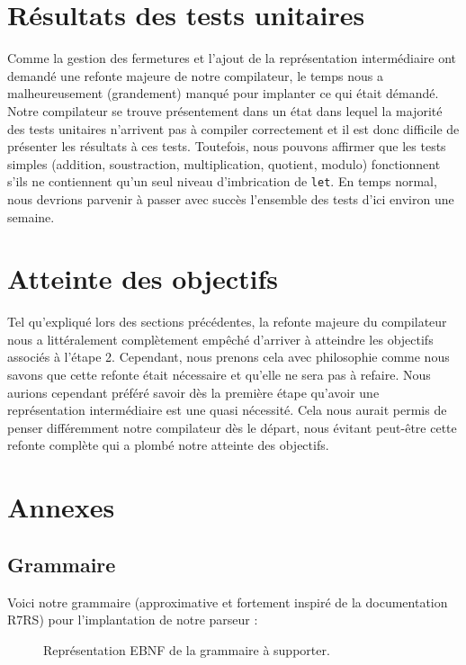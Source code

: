 \documentclass[12pt]{article}
\begin{document}
\section{Résultats des tests unitaires}

Comme la gestion des fermetures et l'ajout de la représentation intermédiaire ont demandé une refonte majeure de notre compilateur, le temps nous a malheureusement (grandement) manqué pour implanter ce qui était démandé. Notre compilateur se trouve présentement dans un état dans lequel la majorité des tests unitaires n'arrivent pas à compiler correctement et il est donc difficile de présenter les résultats à ces tests. Toutefois, nous pouvons affirmer que les tests simples (addition, soustraction, multiplication, quotient, modulo) fonctionnent s'ils ne contiennent qu'un seul niveau d'imbrication de \texttt{let}. En temps normal, nous devrions parvenir à passer avec succès l'ensemble des tests d'ici environ une semaine.

\section{Atteinte des objectifs}

Tel qu'expliqué lors des sections précédentes, la refonte majeure du compilateur nous a littéralement complètement empêché d'arriver à atteindre les objectifs associés à l'étape 2. Cependant, nous prenons cela avec philosophie comme nous savons que cette refonte était nécessaire et qu'elle ne sera pas à refaire. Nous aurions cependant préféré savoir dès la première étape qu'avoir une représentation intermédiaire est une quasi nécessité. Cela nous aurait permis de penser différemment notre compilateur dès le départ, nous évitant peut-être cette refonte complète qui a plombé notre atteinte des objectifs.

\newpage

\section{Annexes}

\subsection{Grammaire}
Voici notre grammaire (approximative et fortement inspiré de la documentation R7RS) pour l'implantation de notre parseur :
\begin{figure}[h!]
  
  \caption{Représentation EBNF de la grammaire à supporter.}
\end{figure}
\end{document}
